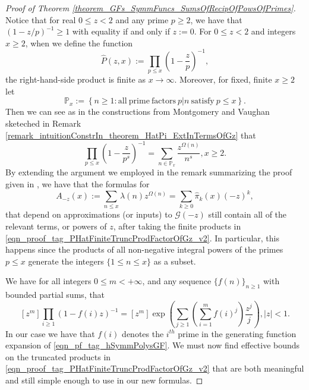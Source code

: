 \documentclass[11pt,reqno,a4letter]{article}
\numberwithin{figure}{section}
\numberwithin{table}{section}
\theoremstyle{plain}
\numberwithin{theorem}{section}
\theoremstyle{definition}
\newcommand{\NBRef}[1]{}
\begin{document}
\NBRef{A06-2020-04-26} 
\begin{proof}[Proof of Theorem \ref{theorem_GFs_SymmFuncs_SumsOfRecipOfPowsOfPrimes}] 
\label{proofOf_theorem_GFs_SymmFuncs_SumsOfRecipOfPowsOfPrimes} 
Notice that for real $0 \leq z < 2$ and any prime $p \geq 2$, we have that 
$\left(1-z/p\right)^{-1} \geq 1$ with equality if and only if $z := 0$. 
For $0 \leq z < 2$ and integers $x \geq 2$, when we define the function 
\[
\widehat{P}(z, x) := \prod_{p \leq x} \left(1 - \frac{z}{p}\right)^{-1}, 
\]
the right-hand-side product is finite as $x \rightarrow \infty$. 
Moreover, for fixed, finite $x \geq 2$ let 
\[
\mathbb{P}_x := \left\{n \geq 1: \mathrm{ all\ prime\ factors\ } 
     p|n \mathrm{\ satisfy\ } p \leq x\right\}. 
\]
Then we can see as in the constructions from Montgomery and Vaughan sketeched in 
Remark \ref{remark_intuitionConstrIn_theorem_HatPi_ExtInTermsOfGz} that 
\begin{equation} 
\label{eqn_proof_tag_PHatFiniteTruncProdFactorOfGz_v2} 
\prod_{p \leq x} \left(1 - \frac{z}{p^s}\right)^{-1} = \sum_{n \in \mathbb{P}_x} 
     \frac{z^{\Omega(n)}}{n^s}, x \geq 2. 
\end{equation} 
By extending the argument we employed in the remark summarizing the proof given in 
\cite[\S 7.4]{MV}, we have that the formulas for 
\[
A_{-z}(x) := \sum_{n \leq x} \lambda(n) z^{\Omega(n)} = 
     \sum_{k \geq 0} \widehat{\pi}_k(x) (-z)^k, 
\]
that depend on approximations (or inputs) to $\mathcal{G}(-z)$ 
still contain all of the relevant terms, or powers of $z$, after taking 
the finite products in \eqref{eqn_proof_tag_PHatFiniteTruncProdFactorOfGz_v2}. 
In particular, this happens since the products of all non-negative integral powers of the 
primes $p \leq x$ generate the integers $\{1 \leq n \leq x\}$ as a subset. 

We have for all integers $0 \leq m < +\infty$, and any sequence 
$\{f(n)\}_{n \geq 1}$ with bounded partial sums, that 
\cite[\S 2]{MACDONALD-SYMFUNCS} 
\begin{equation} 
\label{eqn_pf_tag_hSymmPolysGF} 
[z^m] \prod_{i \geq 1} (1-f(i) z)^{-1} = [z^m] \exp\left(\sum_{j \geq 1} 
     \left(\sum_{i=1}^m f(i)^j\right) \frac{z^j}{j}\right), |z| < 1. 
\end{equation} 
In our case we have that $f(i)$ denotes the $i^{th}$ prime in the 
generating function expansion of \eqref{eqn_pf_tag_hSymmPolysGF}. 
We must now find effective bounds on the truncated products in 
\eqref{eqn_proof_tag_PHatFiniteTruncProdFactorOfGz_v2} 
that are both meaningful and still simple enough to use in our new 
formulas. 


\end{proof}
\end{document}
